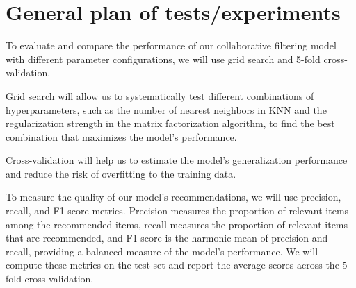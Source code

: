 \section{General plan of tests/experiments}

To evaluate and compare the performance of our collaborative filtering model with different parameter configurations, we will use grid search and 5-fold cross-validation.

Grid search will allow us to systematically test different combinations of hyperparameters, such as the number of nearest neighbors in KNN and the regularization strength in the matrix factorization algorithm, to find the best combination that maximizes the model's performance.

Cross-validation will help us to estimate the model's generalization performance and reduce the risk of overfitting to the training data.

To measure the quality of our model's recommendations, we will use precision, recall, and F1-score metrics. Precision measures the proportion of relevant items among the recommended items, recall measures the proportion of relevant items that are recommended, and F1-score is the harmonic mean of precision and recall, providing a balanced measure of the model's performance. We will compute these metrics on the test set and report the average scores across the 5-fold cross-validation.


